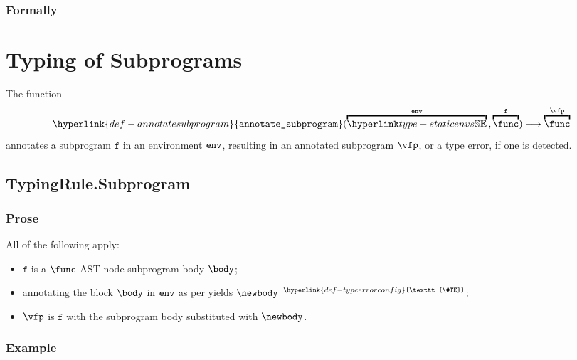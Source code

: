 \documentclass{book}
\newcommand\TypeErrorConfig[0]{\hyperlink{def-typeerrorconfig}{\texttt{\#TE}}}
\newcommand\ProseOrTypeError[0]{\hyperlink{def-proseortypeerror}{$^{\TypeErrorConfig}$}}
\newcommand\annotaterel[0]{\hyperlink{def-annotaterel}{\textsf{type}}}
\newcommand\typearrow[0]{\xrightarrow{\annotaterel}}
\newcommand\findsubprogram[0]{\hyperlink{def-findsubprogram}{\texttt{find\_subprogram}}}
\newcommand\annotatesubprogram[1]{\hyperlink{def-annotatesubprogram}{\texttt{annotate\_subprogram}}(#1)}
\newcommand\vf[0]{\texttt{f}}
\newcommand\nameone[0]{\texttt{name1}}
\newcommand\name[0]{\texttt{name}}
\begin{document}
\begin{emptyformal}
\subsection{Formally}
\end{emptyformal}

\chapter{Typing of Subprograms}
\hypertarget{def-annotatesubprogram}{}
The function
\[
  \annotatesubprogram{\overname{\staticenvs}{\tenv} \aslsep \overname{\func}{\vf}} \aslto \overname{\func}{\vfp}
\]
annotates a subprogram $\vf$ in an environment $\texttt{env}$, resulting in an annotated subprogram $\vfp$,
or a type error, if one is detected.

\section{TypingRule.Subprogram \label{sec:TypingRule.Subprogram}}

\subsection{Prose}
All of the following apply:
\begin{itemize}
  \item $\vf$ is a $\func$ AST node subprogram body $\body$;
  \item annotating the block $\body$ in $\texttt{env}$ as per  yields $\newbody$ \ProseOrTypeError;
  \item $\vfp$ is $\vf$ with the subprogram body substituted with $\newbody$.
\end{itemize}

\subsection{Example}

\end{document}
